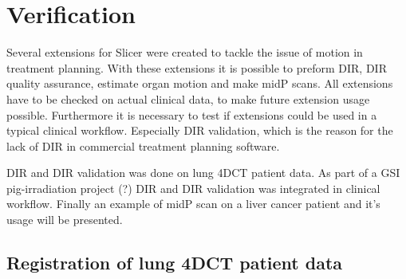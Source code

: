 \documentclass[type=dr, dr=rernat, accentcolor=tud7b,colorbacktitle, bigchapter, openright, twoside, 12pt ]{tudthesis}
\begin{document}
% 
% 



\section{Verification}
\label{Verification}

Several extensions for Slicer were created to tackle the issue of motion in treatment planning. With these extensions it is possible to preform DIR, DIR quality assurance, estimate organ motion and make midP scans. All extensions have to be checked on actual clinical data, to make future extension usage possible. Furthermore it is necessary to test if extensions could be used in a typical clinical workflow. Especially DIR validation, which is the reason for the lack of DIR in commercial treatment planning software. 

DIR and DIR validation was done on lung 4DCT patient data. As part of a GSI pig-irradiation project (?) DIR and DIR validation was integrated in clinical workflow. Finally an example of midP scan on a liver cancer patient and it's usage will be presented.

\subsection{Registration of lung 4DCT patient data}
\label{lungDIR}
\end{document}
